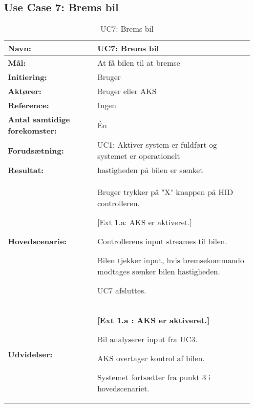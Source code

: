 \subsection{Use Case 7: Brems bil}
\begin{table}[h]
\begin{tabularx}{\textwidth}{| L{3.3 cm} | Z |} \hline

\textbf{Navn:} 							& UC7: Brems bil												\\ \hline
\textbf{Mål:}							& At få bilen til at bremse 									\\ \hline
\textbf{Initiering:}					& Bruger 														\\ \hline
\textbf{Aktører:} 						& Bruger eller AKS 												\\ \hline
\textbf{Reference:} 					& Ingen															\\ \hline
\textbf{Antal samtidige forekomster:} 	& Én 															\\ \hline
\textbf{Forudsætning:} 					& UC1: Aktiver system er fuldført og systemet er operationelt 	\\ \hline
\textbf{Resultat:}						& hastigheden på bilen er sænket 								\\ \hline
\textbf{Hovedscenarie:}					& 

\begin{packed_enum}
\item Bruger trykker på "X" knappen på HID controlleren.
	\begin{packed_item}\itemsep1pt \parskip0pt 
	\item {[}Ext 1.a: AKS er aktiveret.{]}
	\end{packed_item}
\item Controllerens input streames til bilen.
\item Bilen tjekker input, hvis bremsekommando modtages sænker bilen hastigheden.
\item UC7 afsluttes.
\end{packed_enum} \\ \hline
\textbf{Udvidelser:}					&  
\textbf{{[}Ext 1.a : AKS er aktiveret.{]}}
	\begin{packed_enum}\itemsep1pt \parskip0pt 
		\item Bil analyserer input fra UC3. %
		\item AKS overtager kontrol af bilen. %
		\item Systemet fortsætter fra punkt 3 i hovedscenariet.
	\end{packed_enum}
\\ \hline
\end{tabularx}
\caption{UC7: Brems bil}
\label{tbl:UC7}
\end{table}